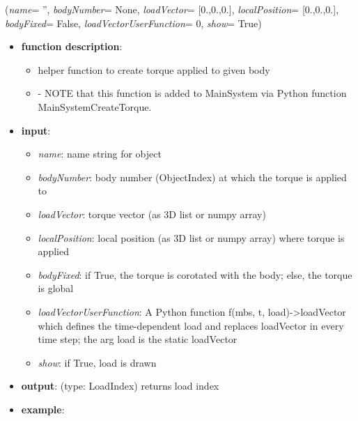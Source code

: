 %
\begin{flushleft}
\label{sec:mainsystemextensions:CreateTorque}
({\it name}= '', {\it bodyNumber}= None, {\it loadVector}= [0.,0.,0.], {\it localPosition}= [0.,0.,0.], {\it bodyFixed}= False, {\it loadVectorUserFunction}= 0, {\it show}= True)
\end{flushleft}
\setlength{\itemindent}{0.7cm}
\begin{itemize}[leftmargin=0.7cm]
\item[--]
{\bf function description}: \vspace{-6pt}
\begin{itemize}[leftmargin=1.2cm]
\setlength{\itemindent}{-0.7cm}
\item[]helper function to create torque applied to given body
\item[]- NOTE that this function is added to MainSystem via Python function MainSystemCreateTorque.
\end{itemize}
\item[--]
{\bf input}: \vspace{-6pt}
\begin{itemize}[leftmargin=1.2cm]
\setlength{\itemindent}{-0.7cm}
\item[]{\it name}: name string for object
\item[]{\it bodyNumber}: body number (ObjectIndex) at which the torque is applied to
\item[]{\it loadVector}: torque vector (as 3D list or numpy array)
\item[]{\it localPosition}: local position (as 3D list or numpy array) where torque is applied
\item[]{\it bodyFixed}: if True, the torque is corotated with the body; else, the torque is global
\item[]{\it loadVectorUserFunction}: A Python function f(mbs, t, load)->loadVector which defines the time-dependent load and replaces loadVector in every time step; the arg load is the static loadVector
\item[]{\it show}: if True, load is drawn
\end{itemize}
\item[--]
{\bf output}: (type: LoadIndex) returns load index
\item[--]
{\bf example}: \vspace{-12pt}\ei\begin{lstlisting}[language=Python, xleftmargin=36pt]

\end{lstlisting}
\end{itemize}
